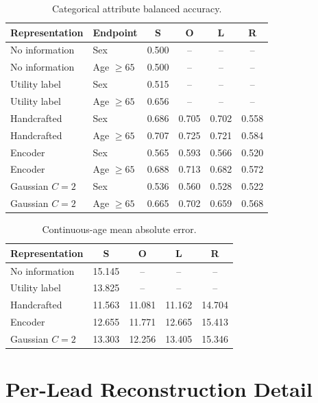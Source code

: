 \documentclass[journal]{IEEEtran}
\begin{document}
\begin{table}[ht]
\centering
\scriptsize
\caption{Categorical attribute balanced accuracy.}
\label{tab:attribute-ba}
\begin{tabular}{llcccc}
\toprule
Representation & Endpoint & S & O & L & R \\
\midrule
No information & Sex & 0.500 & -- & -- & -- \\
No information & Age $\geq65$ & 0.500 & -- & -- & -- \\
Utility label & Sex & 0.515 & -- & -- & -- \\
Utility label & Age $\geq65$ & 0.656 & -- & -- & -- \\
\midrule
Handcrafted & Sex & 0.686 & 0.705 & 0.702 & 0.558 \\
Handcrafted & Age $\geq65$ & 0.707 & 0.725 & 0.721 & 0.584 \\
Encoder & Sex & 0.565 & 0.593 & 0.566 & 0.520 \\
Encoder & Age $\geq65$ & 0.688 & 0.713 & 0.682 & 0.572 \\
Gaussian $C=2$ & Sex & 0.536 & 0.560 & 0.528 & 0.522 \\
Gaussian $C=2$ & Age $\geq65$ & 0.665 & 0.702 & 0.659 & 0.568 \\
\bottomrule
\end{tabular}
\end{table}

\begin{table}[ht]
\centering
\scriptsize
\caption{Continuous-age mean absolute error.}
\label{tab:attribute-mae}
\begin{tabular}{lcccc}
\toprule
Representation & S & O & L & R \\
\midrule
No information & 15.145 & -- & -- & -- \\
Utility label & 13.825 & -- & -- & -- \\
\midrule
Handcrafted & 11.563 & 11.081 & 11.162 & 14.704 \\
Encoder & 12.655 & 11.771 & 12.665 & 15.413 \\
Gaussian $C=2$ & 13.303 & 12.256 & 13.405 & 15.346 \\
\bottomrule
\end{tabular}
\end{table}

\section{Per-Lead Reconstruction Detail}
\label{app:reconstruction}
\end{document}
